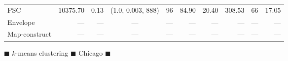 \begin{figure}
\begin{center}
\begin{minipage}{\textwidth}
{\begin{tabular}{@{}lrrcrrrrrr@{}}
        PSC & 10375.70 & 0.13 & (1.0, 0.003, 888) & 96 & 84.90 & 20.40 & 308.53 & 66 & 17.05\\
        Envelope & --- & --- & --- & --- & --- & --- & --- & --- & ---\\
        Map-construct & --- & --- & --- & --- & --- & --- & --- & --- & ---\\
        \bottomrule
    \end{tabular}
    }
    \end{minipage}
%
        \caption{$\blacksquare$ $k$-means clustering $\blacksquare$ Chicago   $\blacksquare$}
%
    \end{center} \end{figure}
\clearpage
\newpage 
%
\clearpage
